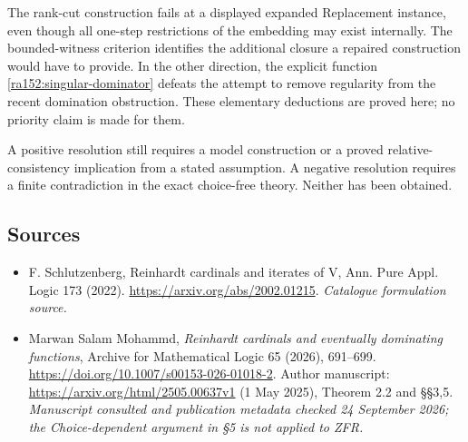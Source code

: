 \documentclass[11pt]{article}
\begin{document}
The rank-cut construction fails at a displayed expanded Replacement instance,
even though all one-step restrictions of the embedding may exist internally.
The bounded-witness criterion identifies the additional closure a repaired
construction would have to provide.  In the other direction, the explicit
function \eqref{ra152:singular-dominator} defeats the attempt to remove
regularity from the recent domination obstruction.  These elementary
deductions are proved here; no priority claim is made for them.

A positive resolution still requires a model construction or a proved
relative-consistency implication from a stated assumption.  A negative
resolution requires a finite contradiction in the exact choice-free theory.
Neither has been obtained.
\subsection{Sources}
\begin{itemize}\raggedright
\item[\textnormal{[S1]}]\hypertarget{source:152:1}{} F. Schlutzenberg, Reinhardt cardinals and iterates of V, Ann. Pure Appl. Logic 173 (2022).
\url{https://arxiv.org/abs/2002.01215}.
{\small\textit{Catalogue formulation source.}}
\item[\textnormal{[E1]}]\hypertarget{extra:152:1}{} Marwan Salam Mohammd,
\emph{Reinhardt cardinals and eventually dominating functions},
Archive for Mathematical Logic 65 (2026), 691--699.
\url{https://doi.org/10.1007/s00153-026-01018-2}.
Author manuscript: \url{https://arxiv.org/html/2505.00637v1} (1 May 2025),
Theorem 2.2 and \S\S3,5.
{\small\textit{Manuscript consulted and publication metadata checked
24 September 2026; the Choice-dependent argument in \S5 is not applied to ZFR.}}
\end{itemize}
\end{document}
